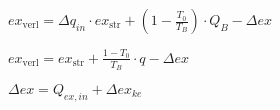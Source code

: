 \( ex_{\text{verl}} = \Delta q_{in} \cdot ex_{\text{str}} + \left( 1 - \frac{T_0}{T_B} \right) \cdot Q_B - \Delta ex \)  

\( ex_{\text{verl}} = ex_{\text{str}} + \frac{1 - T_0}{T_B} \cdot q - \Delta ex \)  

\( \Delta ex = Q_{ex,in} + \Delta ex_{ke} \)